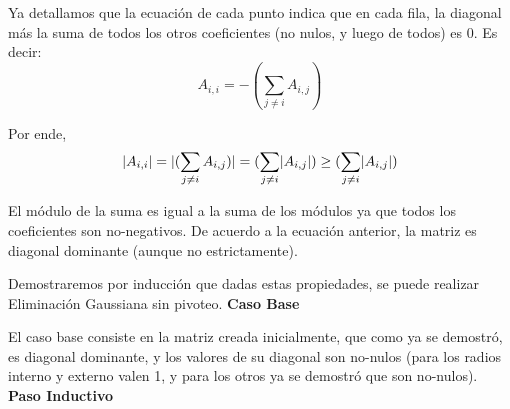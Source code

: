 \par Ya detallamos que la ecuaci\'on de cada punto indica que en cada fila, la diagonal m\'as la suma de todos los otros coeficientes (no nulos, y luego de todos) es 0. Es decir:
\begin{equation}
A_{i, i} = - (\sum_{j\neq i} A_{i, j})
\end{equation}
\par Por ende, 
\begin{equation}
    \lvert A_{i, i}\rvert = \lvert(\sum_{j\neq i} A_{i, j})\rvert = (\sum_{j\neq i} \lvert A_{i, j}\rvert) \geq (\sum_{j\neq i} \lvert A_{i, j}\rvert)
\end{equation}
\par El m\'odulo de la suma es igual a la suma de los m\'odulos ya que todos los coeficientes son no-negativos.
De acuerdo a la ecuaci\'on anterior, la matriz es diagonal dominante (aunque no estrictamente).
\par Demostraremos por inducci\'on que dadas estas propiedades, se puede realizar Eliminaci\'on Gaussiana sin pivoteo.\newline
\newline
\textbf{Caso Base}


\par El caso base consiste en la matriz creada inicialmente, que como ya se demostr\'o, es diagonal dominante, y los valores de su diagonal son no-nulos (para los radios interno y externo valen 1, y
para los otros ya se demostr\'o que son no-nulos).\newline
\newline
\textbf{}
\textbf{Paso Inductivo}


